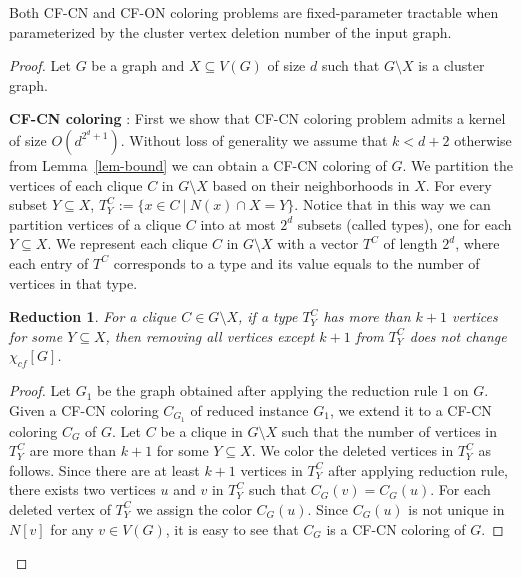 \documentclass[svgnames]{llncs}
\newtheorem{Reduction}{Reduction}
\newcommand{\cfcn}{\textsc {CF-CN}}
\newcommand{\cfon}{\textsc {CF-ON}}
\begin{document}
\begin{theorem} \label{th-dcluster}
Both \cfcn{} and \cfon{} coloring problems are fixed-parameter tractable when parameterized by the cluster vertex deletion number of the input graph.
 \end{theorem}
\begin{proof}
Let $G$ be a graph and $X \subseteq V(G)$ of size $d$ such that $G \setminus X$ is a cluster graph. 
\par {\bf \cfcn{} coloring} :
First we show that \cfcn{} coloring problem admits a kernel of size $O(d^{2^d+1})$.
Without loss of generality we assume that $k < d+2$ otherwise from Lemma~\ref{lem-bound} we can obtain a \cfcn{} coloring of $G$.
We partition the vertices of each clique $C$ in $G \setminus X$ based on their neighborhoods in $X$.
For every subset $Y \subseteq X$, $T_Y^C:=\{x \in C ~|~ N(x) \cap X=Y\}$. 
Notice that in this way we can partition vertices of a clique $C$ into at most $2^{d}$ subsets (called types), 
one for each $Y \subseteq X$.
We represent each clique $C$ in $G \setminus X$ with a vector $T^C$ of length $2^{d}$, where each entry of $T^C$ corresponds to a type and its value equals to the number of vertices in that type.

\begin{Reduction}
For a clique $C \in G \setminus X$, if a type $T_Y^C$ has more than $k+1$ vertices for some $Y \subseteq X$, then removing
all vertices except $k+1$ from $T^C_Y$ does not change $ \chi_{cf} [G]$. 
\end{Reduction}

\begin{proof}
Let $G_1$ be the graph obtained after applying the reduction rule $1$ on $G$.
Given a \cfcn{} coloring $C_{G_1}$ of reduced instance $G_1$, we extend it to a \cfcn{} coloring $C_G$ of $G$.
Let $C$ be a clique in $G \setminus X$ such that the number of vertices in $T_Y^C$ are more than $k+1$ for some $Y \subseteq X$.
We color the  deleted vertices in $T_Y^C$ as follows.
Since there are at least $k+1$ vertices in $T_Y^C$ after applying reduction rule, 
there exists two vertices $u$ and $v$ in $T_Y^C$ such that $C_G(v)=C_G(u)$. 
For each deleted vertex of $T_Y^C$ we assign the color $C_G(u)$. 
Since $C_G(u)$ is not unique in $N[v]$ for any $v \in V(G)$, it is easy to see that $C_G$ is a \cfcn{} coloring of $G$.
\end{proof}



\end{proof}
\end{document}
